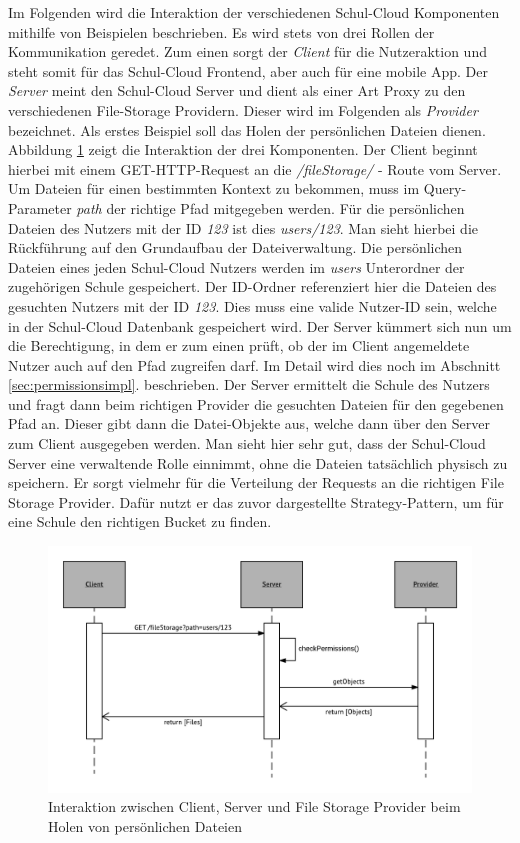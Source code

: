 
Im Folgenden wird die Interaktion der verschiedenen Schul-Cloud Komponenten mithilfe von Beispielen beschrieben. Es wird stets von drei Rollen der Kommunikation geredet. Zum einen sorgt der \textit{Client} für die Nutzeraktion und steht somit für das Schul-Cloud Frontend, aber auch für eine mobile App. Der \textit{Server} meint den Schul-Cloud Server und dient als einer Art Proxy zu den verschiedenen File-Storage Providern. Dieser wird im Folgenden als \textit{Provider} bezeichnet. Als erstes Beispiel soll das Holen der persönlichen Dateien dienen. Abbildung \ref{fig:interacton_getFiles} zeigt die Interaktion der drei Komponenten. Der Client beginnt hierbei mit einem GET-HTTP-Request an die \textit{/fileStorage/} - Route vom Server. Um Dateien für einen bestimmten Kontext zu bekommen, muss im Query-Parameter \textit{path} der richtige Pfad mitgegeben werden. Für die persönlichen Dateien des Nutzers mit der ID \textit{123} ist dies \textit{users/123}. Man sieht hierbei die Rückführung auf den Grundaufbau der Dateiverwaltung. Die persönlichen Dateien eines jeden Schul-Cloud Nutzers werden im \textit{users} Unterordner der zugehörigen Schule gespeichert. Der ID-Ordner referenziert hier die Dateien des gesuchten Nutzers mit der ID \textit{123}. Dies muss eine valide Nutzer-ID sein, welche in der Schul-Cloud Datenbank gespeichert wird. Der Server kümmert sich nun um die Berechtigung, in dem er zum einen prüft, ob der im Client angemeldete Nutzer auch auf den Pfad zugreifen darf. Im Detail wird dies noch im Abschnitt \ref{sec:permissionsimpl}. beschrieben. Der Server ermittelt die Schule des Nutzers und fragt dann beim richtigen Provider die gesuchten Dateien für den gegebenen Pfad an. Dieser gibt dann die Datei-Objekte aus, welche dann über den Server zum Client ausgegeben werden. Man sieht hier sehr gut, dass der Schul-Cloud Server eine verwaltende Rolle einnimmt, ohne die Dateien tatsächlich physisch zu speichern. Er sorgt vielmehr für die Verteilung der Requests an die richtigen File Storage Provider. Dafür nutzt er das zuvor dargestellte Strategy-Pattern, um für eine Schule den richtigen Bucket zu finden.

\begin{figure}[H]
	\centering
	\includegraphics[width=1\linewidth]{images/fileumlsequence}
	\caption[Caption for concept]{Interaktion zwischen Client, Server und File Storage Provider  beim Holen von persönlichen Dateien}
	\label{fig:interacton_getFiles}
\end{figure}

